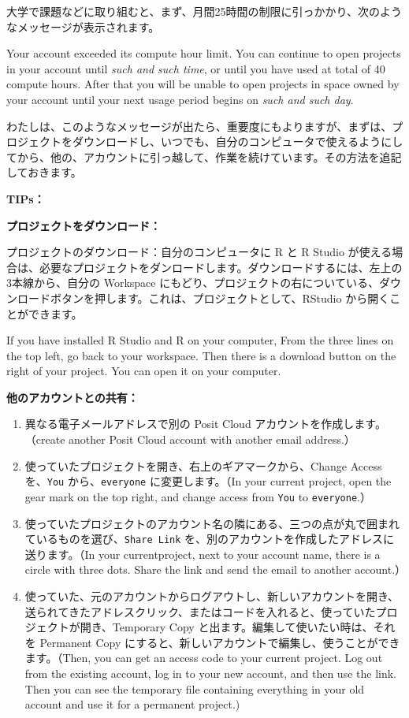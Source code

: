 \documentclass[
  xelatex, ja=standard]{bxjsbook}
\providecommand{\tightlist}{%
  \setlength{\itemsep}{0pt}\setlength{\parskip}{0pt}}
\theoremstyle{definition}
\theoremstyle{definition}
\theoremstyle{definition}
\theoremstyle{definition}
\theoremstyle{remark}
\begin{document}
大学で課題などに取り組むと、まず、月間25時間の制限に引っかかり、次のようなメッセージが表示されます。

Your account exceeded its compute hour limit. You can continue to open projects in your account until \emph{such and such time}, or until you have used at total of 40 compute hours. After that you will be unable to open projects in space owned by your account until your next usage period begins on \emph{such and such day}.

わたしは、このようなメッセージが出たら、重要度にもよりますが、まずは、プロジェクトをダウンロードし、いつでも、自分のコンピュータで使えるようにしてから、他の、アカウントに引っ越して、作業を続けています。その方法を追記しておきます。

\textbf{TIPs：}

\textbf{プロジェクトをダウンロード：}

プロジェクトのダウンロード：自分のコンピュータに R と R Studio が使える場合は、必要なプロジェクトをダンロードします。ダウンロードするには、左上の3本線から、自分の Workspace にもどり、プロジェクトの右についている、ダウンロードボタンを押します。これは、プロジェクトとして、RStudio から開くことができます。

If you have installed R Studio and R on your computer, From the three lines on the top left, go back to your workspace. Then there is a download button on the right of your project. You can open it on your computer.

\textbf{他のアカウントとの共有：}

\begin{enumerate}
\def\labelenumi{\arabic{enumi}.}
\tightlist
\item
  異なる電子メールアドレスで別の Posit Cloud アカウントを作成します。（create another Posit Cloud account with another email address.）
\item
  使っていたプロジェクトを開き、右上のギアマークから、Change Access を、\texttt{You} から、\texttt{everyone} に変更します。（In your current project, open the gear mark on the top right, and change access from \texttt{You} to \texttt{everyone}.）
\item
  使っていたプロジェクトのアカウント名の隣にある、三つの点が丸で囲まれているものを選び、\texttt{Share\ Link} を、別のアカウントを作成したアドレスに送ります。（In your currentproject, next to your account name, there is a circle with three dots. Share the link and send the email to another account.）
\item
  使っていた、元のアカウントからログアウトし、新しいアカウントを開き、送られてきたアドレスクリック、またはコードを入れると、使っていたプロジェクトが開き、Temporary Copy と出ます。編集して使いたい時は、それを Permanent Copy にすると、新しいアカウントで編集し、使うことができます。（Then, you can get an access code to your current project. Log out from the existing account, log in to your new account, and then use the link. Then you can see the temporary file containing everything in your old account and use it for a permanent project.)
\end{enumerate}
\end{document}
